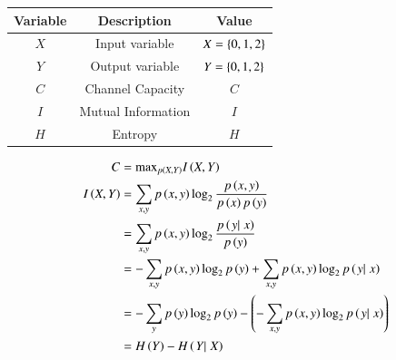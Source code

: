 \documentclass[article]{IEEEtran}
\theoremstyle{remark}
\begin{document}
\begin{tabular}{|c|c|c|} \hline
Variable & Description & Value\\\hline
$X$ & Input variable & $X = \left\{0,1,2\right\}$\\\hline
$Y$ & Output variable & $Y = \left\{0,1,2\right\}$\\\hline
$C$ & Channel Capacity & $C$\\\hline
$I$ & Mutual Information & $I$ \\\hline
$H$ & Entropy & $H$ \\\hline
\end{tabular}
\begin{align}
C &=\text{max}_{p\left(X,Y\right)} I\left(X,Y\right)\\
I\left(X,Y\right) &= \sum_{x,y}p\left(x,y\right)\log_2\frac{p\left(x,y\right)}{p\left(x\right)p\left(y\right)}\\
&= \sum_{x,y}p\left(x,y\right)\log_2\frac{p\left(\left.{y}|\right.{x}\right)}{p\left(y\right)}\\
&=-\sum_{x,y}p\left(x,y\right)\log_2p\left(y\right)+\sum_{x,y}p\left(x,y\right)\log_2p\left(\left.{y}|\right.{x}\right)\\
&=-\sum_{y}p\left(y\right)\log_2p\left(y\right)-\left(-\sum_{x,y}p\left(x,y\right)\log_2p\left(\left.{y}|\right.{x}\right)\right)\\
&= H\left(Y\right) - H\left(\left.{Y}|\right.{X}\right)\label{eq:1}
\end{align}
\end{document}
